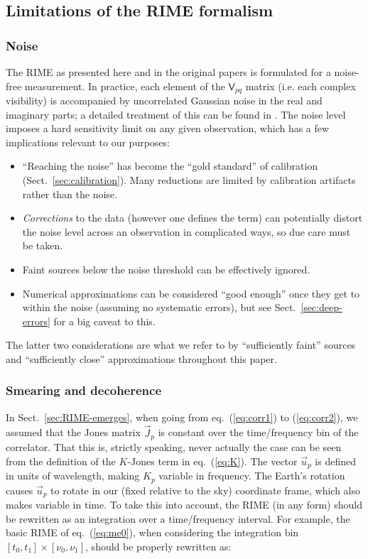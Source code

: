 \documentclass[]{aa}
\newcommand{\jones}[2]{\vec {#1}_{#2}}
\newcommand{\coh}[2]{\mathsf{{#1}}_{{#2}}}
\begin{document}
\subsection{Limitations of the RIME formalism\label{sec:rime-limitations}}

\subsubsection{\label{sec:noise}Noise}

The RIME as presented here and in the original papers is formulated for a noise-free measurement. In practice, each element of the $\coh{V}{pq}$ matrix (i.e. each complex visibility) is accompanied by uncorrelated Gaussian noise in the real and imaginary parts; a detailed treatment of this can be found in \citet[Sect.~6.2]{tms}. The noise level imposes a hard sensitivity limit on any given observation, which has a few implications relevant to our purposes:

\begin{itemize}
\item ``Reaching the noise'' has become the ``gold standard'' of calibration (Sect.~\ref{sec:calibration}). 
Many reductions are limited by calibration artifacts rather than the noise.
\item {\em Corrections} to the data (however one defines the term) can potentially distort the noise level across an observation in complicated ways, so due care must be taken.
\item Faint sources below the noise threshold can be effectively ignored.
\item Numerical approximations can be considered ``good enough'' once they get to within the noise (assuming no systematic errors), but see Sect.~\ref{sec:deep-errors} for a big caveat to this.
\end{itemize}

The latter two considerations are what we refer to by ``sufficiently faint'' sources and ``sufficiently close'' approximations throughout this paper.

\subsubsection{\label{sec:smearing}Smearing and decoherence}

In Sect.~\ref{sec:RIME-emerges}, when going from eq.~(\ref{eq:corr1}) to (\ref{eq:corr2}), we assumed that the Jones matrix $\jones{J}{p}$ is constant over the time/frequency bin of the correlator. That this is, strictly speaking, never actually the case can be seen from the definition of the $K$-Jones term in eq.~(\ref{eq:K}). The vector $\vec u_p$ is defined in units of wavelength, making $K_p$ variable in frequency. The Earth's rotation causes $\vec u_p$ to rotate in our (fixed relative to the sky) coordinate frame, which also makes variable in time. To take this into account, the RIME (in any form) should be rewritten as an integration over a time/frequency interval. For example, the basic RIME of eq.~(\ref{eq:me0}), when considering the integration bin $[t_0,t_1]\times[\nu_0,\nu_1]$, should be properly rewritten as:
\end{document}
